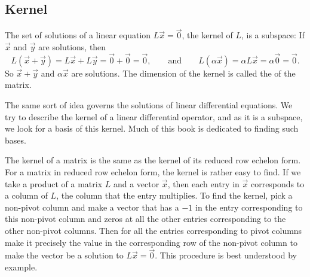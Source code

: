\subsection{Kernel}

The set of solutions of a linear equation $L\vec{x} = \vec{0}$,
the kernel of $L$, is a subspace:
If $\vec{x}$ and $\vec{y}$ are solutions,
then
\begin{equation*}
L(\vec{x}+\vec{y}) =
L\vec{x}+L\vec{y} =
\vec{0}+\vec{0} = \vec{0} ,
\qquad \text{and} \qquad
L(\alpha \vec{x}) =
\alpha L \vec{x} =
\alpha \vec{0} = \vec{0}.
\end{equation*}
So $\vec{x}+\vec{y}$ and $\alpha \vec{x}$ are solutions.
The dimension of the kernel is called the \emph{} of the
matrix.

The same sort of idea governs the solutions of linear differential
equations.  We try to describe the kernel of a linear differential
operator, and as it is a subspace, we look for a basis of this
kernel.  Much of this book is dedicated to finding such bases.

The kernel of a matrix is the same as the kernel of its reduced row echelon
form.  For a matrix in reduced row echelon form, the kernel is rather easy to
find.  If we take a product of a matrix $L$ and a vector $\vec{x}$,
then each entry in
$\vec{x}$ corresponds to a column of $L$, the column that the entry
multiplies.
To find the kernel,
pick a
non-pivot column and make a vector that has a $-1$ in the entry
corresponding to this non-pivot column and zeros at all the other entries
corresponding to the other non-pivot columns.
Then for all the entries
corresponding to pivot columns make it precisely the value in the
corresponding row of the non-pivot column to make the vector be a
solution to $L \vec{x} = \vec{0}$.
This procedure is best understood by example.


